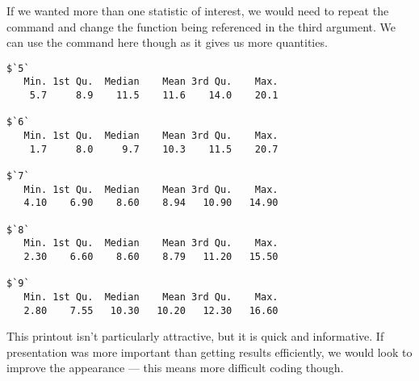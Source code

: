 If we wanted more than one statistic of interest, we would need to repeat the command and change the function being referenced in the third argument. We can use the  command here though as it gives us more quantities. 
\begin{knitrout}
\color{fgcolor}\begin{kframe}
\begin{alltt}
\hlstd{> }
\end{alltt}
\begin{verbatim}
$`5`
   Min. 1st Qu.  Median    Mean 3rd Qu.    Max. 
    5.7     8.9    11.5    11.6    14.0    20.1 

$`6`
   Min. 1st Qu.  Median    Mean 3rd Qu.    Max. 
    1.7     8.0     9.7    10.3    11.5    20.7 

$`7`
   Min. 1st Qu.  Median    Mean 3rd Qu.    Max. 
   4.10    6.90    8.60    8.94   10.90   14.90 

$`8`
   Min. 1st Qu.  Median    Mean 3rd Qu.    Max. 
   2.30    6.60    8.60    8.79   11.20   15.50 

$`9`
   Min. 1st Qu.  Median    Mean 3rd Qu.    Max. 
   2.80    7.55   10.30   10.20   12.30   16.60 
\end{verbatim}
\end{kframe}
\end{knitrout}
 
This printout isn't particularly attractive, but it is quick and informative. If presentation was more important than getting results efficiently, we would look to improve the appearance --- this means more difficult coding though. 
 
